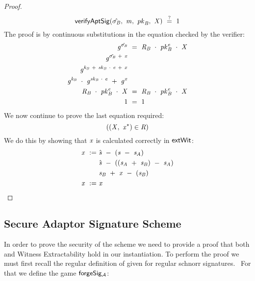 \begin{proof}
    \[
        \mathsf{verifyAptSig}(\hat{\sigma_{\mathit{B}}} ,~ \mathit{m} ,~ \mathit{pk}_{\mathit{B}} ,~ \mathit{X}) ~\stackrel{?}{=}~ 1
    \]
    The proof is by continuous substitutions in the equation checked by the verifier:
    \begin{align}
        \mathit{g}^{\hat{\sigma_{\mathit{B}}}} &~=~ \mathit{R}_{\mathit{B}} ~\cdot~ \mathit{pk}_{\mathit{B}}^{\mathit{e}} ~\cdot~ \mathit{X} \\
        \mathit{g}^{\tilde{\sigma_{\mathit{B}}} ~+~ \mathit{x}} & \\
        \mathit{g}^{\mathit{\mathit{k}_{\mathit{B}}} ~+~ \mathit{sk}_{\mathit{B}} ~\cdot~ \mathit{e} ~+~ \mathit{x}} & \\
        \mathit{g}^{\mathit{\mathit{k}_{\mathit{B}}}} ~\cdot~ \mathit{g}^{\mathit{sk}_{\mathit{B}} ~\cdot~ \mathit{e}} ~+~ \mathit{g}^{\mathit{x}} & \\
        \mathit{R}_{\mathit{B}} ~\cdot~ \mathit{pk}_{\mathit{B}}^{\mathit{e}} ~\cdot~ \mathit{X} &~=~ \mathit{R}_{\mathit{B}} ~\cdot~ \mathit{pk}_{\mathit{B}}^{\mathit{e}} ~\cdot~ \mathit{X} \\
        1 &~=~ 1
    \end{align}
    We now continue to prove the last equation required:
    \[
        ((\mathit{X} ,~ \mathit{x}^*) \in \mathit{R})
    \]
    We do this by showing that $\mathit{x}$ is calculated correctly in $\mathsf{extWit}$:
    \begin{align}
        \mathit{x} ~:=~ & \hat{\mathit{s}} ~-~ (\mathit{s} ~-~ \mathit{s}_{\mathit{A}}) \\
        & \hat{\mathit{s}} ~-~ ((\mathit{s}_{\mathit{A}} ~+~ \mathit{s}_{\mathit{B}} ) ~-~ \mathit{s}_{\mathit{A}} ) \\
        & \mathit{s}_{\mathit{B}} ~+~ \mathit{x} ~-~ (\mathit{s}_{\mathit{B}}) \\
        \mathit{x} ~:=~ & \mathit{x} \\
    \end{align}
\end{proof}

\subsection{Secure Adaptor Signature Scheme}\label{subsec:cnstsecureaptscheme}

In order to prove the security of the scheme we need to provide a proof that both \cnstaEUFCMA and Witness Extractability hold in our instantiation.
To perform the proof we must first recall the regular definition of \cnstEUFCMA given for regular schnorr signatures.~\cite{schnorr1989efficient} For that we define the game $\mathsf{forgeSig_{\mathcal{A}}}$:

